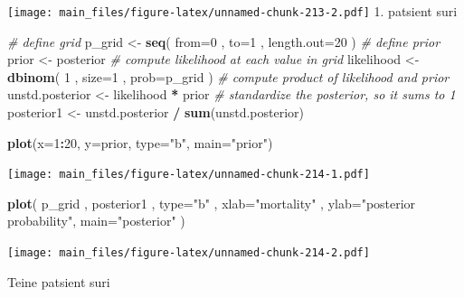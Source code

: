 \documentclass[]{book}
\newenvironment{Shaded}{\begin{snugshade}}{\end{snugshade}}
\newcommand{\KeywordTok}[1]{\textcolor[rgb]{0.13,0.29,0.53}{\textbf{#1}}}
\newcommand{\DataTypeTok}[1]{\textcolor[rgb]{0.13,0.29,0.53}{#1}}
\newcommand{\DecValTok}[1]{\textcolor[rgb]{0.00,0.00,0.81}{#1}}
\newcommand{\StringTok}[1]{\textcolor[rgb]{0.31,0.60,0.02}{#1}}
\newcommand{\CommentTok}[1]{\textcolor[rgb]{0.56,0.35,0.01}{\textit{#1}}}
\newcommand{\OperatorTok}[1]{\textcolor[rgb]{0.81,0.36,0.00}{\textbf{#1}}}
\newcommand{\NormalTok}[1]{#1}
\begin{document}
\texttt{[image: main\_files/figure-latex/unnamed-chunk-213-2.pdf]} 1.
patsient suri

\begin{Shaded}
\begin{Highlighting}[]
\CommentTok{# define grid}
\NormalTok{p_grid <-}\StringTok{ }\KeywordTok{seq}\NormalTok{( }\DataTypeTok{from=}\DecValTok{0}\NormalTok{ , }\DataTypeTok{to=}\DecValTok{1}\NormalTok{ , }\DataTypeTok{length.out=}\DecValTok{20}\NormalTok{ )}
\CommentTok{# define prior}
\NormalTok{prior <-}\StringTok{ }\NormalTok{posterior}
\CommentTok{# compute likelihood at each value in grid}
\NormalTok{likelihood <-}\StringTok{ }\KeywordTok{dbinom}\NormalTok{( }\DecValTok{1}\NormalTok{ , }\DataTypeTok{size=}\DecValTok{1}\NormalTok{ , }\DataTypeTok{prob=}\NormalTok{p_grid )}
\CommentTok{# compute product of likelihood and prior}
\NormalTok{unstd.posterior <-}\StringTok{ }\NormalTok{likelihood }\OperatorTok{*}\StringTok{ }\NormalTok{prior}
\CommentTok{# standardize the posterior, so it sums to 1}
\NormalTok{posterior1 <-}\StringTok{ }\NormalTok{unstd.posterior }\OperatorTok{/}\StringTok{ }\KeywordTok{sum}\NormalTok{(unstd.posterior)}

\KeywordTok{plot}\NormalTok{(}\DataTypeTok{x=}\DecValTok{1}\OperatorTok{:}\DecValTok{20}\NormalTok{, }\DataTypeTok{y=}\NormalTok{prior, }\DataTypeTok{type=}\StringTok{"b"}\NormalTok{, }\DataTypeTok{main=}\StringTok{"prior"}\NormalTok{)}
\end{Highlighting}
\end{Shaded}

\texttt{[image: main\_files/figure-latex/unnamed-chunk-214-1.pdf]}

\begin{Shaded}
\begin{Highlighting}[]
\KeywordTok{plot}\NormalTok{( p_grid , posterior1 , }\DataTypeTok{type=}\StringTok{"b"}\NormalTok{ ,}
    \DataTypeTok{xlab=}\StringTok{"mortality"}\NormalTok{ , }\DataTypeTok{ylab=}\StringTok{"posterior probability"}\NormalTok{, }\DataTypeTok{main=}\StringTok{"posterior"}\NormalTok{ )}
\end{Highlighting}
\end{Shaded}

\texttt{[image: main\_files/figure-latex/unnamed-chunk-214-2.pdf]}

Teine patsient suri
\end{document}
